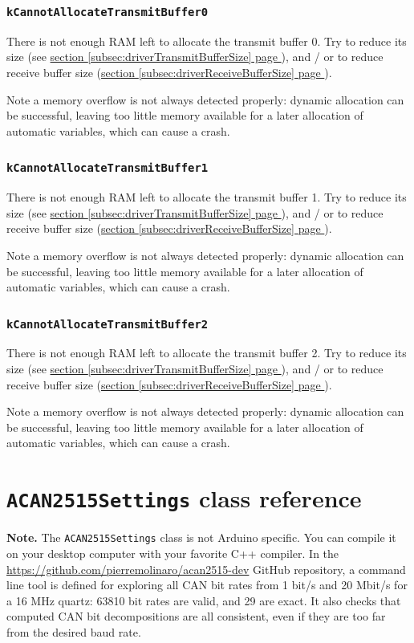 \documentclass[10pt, a4paper, obeyspaces]{extarticle}
\newcommand \sectionLabel[2]{\section{#1}\label{sec:#2}}
\newcommand\refSubsectionPage[1]{\hyperref[subsec:#1]{section \ref*{subsec:#1} page \pageref{subsec:#1}}}
\newcommand \subsubsectionLabel[2]{\subsubsection{#1}\label{subsubsec:#2}}
\begin{document}
\subsubsectionLabel{\texttt{kCannotAllocateTransmitBuffer0}}{kCannotAllocateTransmitBuffer0}

There is not enough RAM left to allocate the transmit buffer 0. Try to reduce its size (see \refSubsectionPage{driverTransmitBufferSize}), and / or to reduce receive buffer size (\refSubsectionPage{driverReceiveBufferSize}).

Note a memory overflow is not always detected properly: dynamic allocation can be successful, leaving too little memory available for a later allocation of automatic variables, which can cause a crash.



\subsubsectionLabel{\texttt{kCannotAllocateTransmitBuffer1}}{kCannotAllocateTransmitBuffer1}

There is not enough RAM left to allocate the transmit buffer 1. Try to reduce its size (see \refSubsectionPage{driverTransmitBufferSize}), and / or to reduce receive buffer size (\refSubsectionPage{driverReceiveBufferSize}).

Note a memory overflow is not always detected properly: dynamic allocation can be successful, leaving too little memory available for a later allocation of automatic variables, which can cause a crash.




\subsubsectionLabel{\texttt{kCannotAllocateTransmitBuffer2}}{kCannotAllocateTransmitBuffer2}

There is not enough RAM left to allocate the transmit buffer 2. Try to reduce its size (see \refSubsectionPage{driverTransmitBufferSize}), and / or to reduce receive buffer size (\refSubsectionPage{driverReceiveBufferSize}).

Note a memory overflow is not always detected properly: dynamic allocation can be successful, leaving too little memory available for a later allocation of automatic variables, which can cause a crash.














\sectionLabel{\texttt{ACAN2515Settings} class reference}{ACAN2515SettingsRef}

{\bf Note. } The \texttt{ACAN2515Settings} class is not Arduino specific. You can compile it on your desktop computer with your favorite C++ compiler. In the \url{https://github.com/pierremolinaro/acan2515-dev} GitHub repository, a command line tool is defined for exploring all CAN bit rates from 1 bit/s and 20 Mbit/s for a 16 MHz quartz: 63810 bit rates are valid, and 29 are exact. It also checks that computed CAN bit decompositions are all consistent, even if they are too far from the desired baud rate.
\end{document}
